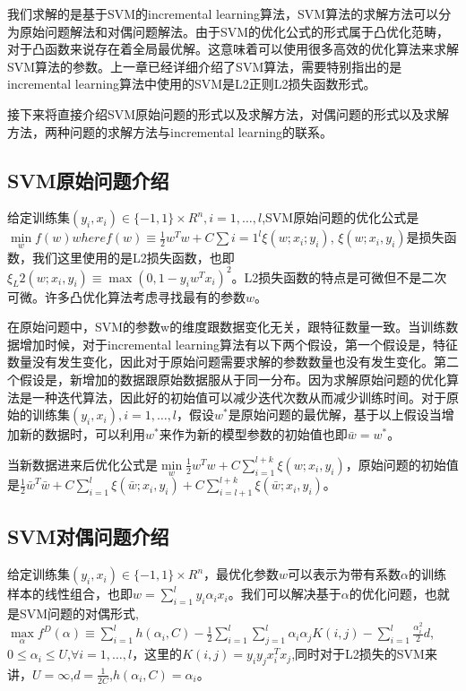 \documentclass[master]{njuthesis}
\begin{document}
\begin{enumerate}
\begin{enumerate}
\begin{enumerate}
    我们求解的是基于SVM的incremental learning算法，SVM算法的求解方法可以分为原始问题解法和对偶问题解法。由于SVM的优化公式的形式属于凸优化范畴，对于凸函数来说存在着全局最优解。这意味着可以使用很多高效的优化算法来求解SVM算法的参数。上一章已经详细介绍了SVM算法，需要特别指出的是incremental learning算法中使用的SVM是L2正则L2损失函数形式。

    接下来将直接介绍SVM原始问题的形式以及求解方法，对偶问题的形式以及求解方法，两种问题的求解方法与incremental learning的联系。

\subsection{SVM原始问题介绍}

    给定训练集$\left(y_i,x_i\right) \in \{-1, 1\} \times R^n, i = 1,\dots,l$,SVM原始问题的优化公式是$\min\limits_{w} f\left(w\right) where f\left(w\right)\equiv \frac{1}{2}w^Tw + C\sum{i=1}^l \xi\left(w;x_i;y_i\right)$, $\xi\left(w;x_i,y_i\right)$是损失函数，我们这里使用的是L2损失函数，也即$\xi_L2\left(w;x_i,y_i\right) \equiv \max\left(0,1-y_iw^Tx_i\right)^2$。L2损失函数的特点是可微但不是二次可微。许多凸优化算法考虑寻找最有的参数$w$。

   在原始问题中，SVM的参数w的维度跟数据变化无关，跟特征数量一致。当训练数据增加时候，对于incremental learning算法有以下两个假设，第一个假设是，特征数量没有发生变化，因此对于原始问题需要求解的参数数量也没有发生变化。第二个假设是，新增加的数据跟原始数据服从于同一分布。因为求解原始问题的优化算法是一种迭代算法，因此好的初始值可以减少迭代次数从而减少训练时间。对于原始的训练集$\left(y_i,x_i\right),i=1,\dots,l$，假设$w^*$是原始问题的最优解，基于以上假设当增加新的数据时，可以利用$w^*$来作为新的模型参数的初始值也即$\bar{w}=w^*$。

    当新数据进来后优化公式是$\min\limits_{w} \frac{1}{2}w^Tw+C\sum_{i=1}^{l+k} \xi\left(w;x_i,y_i\right)$，原始问题的初始值是$\frac{1}{2}\bar{w}^T\bar{w}+C\sum_{i=1}^l \xi\left(\bar{w};x_i,y_i\right)+C\sum_{i=l+1}^{l+k}\xi\left(\bar{w};x_i,y_i\right)$。

\subsection{SVM对偶问题介绍}
    
    给定训练集$\left(y_i,x_i\right) \in \{-1,1\} \times R^n$，最优化参数$w$可以表示为带有系数$\alpha$的训练样本的线性组合，也即$w=\sum_{i=1}^l y_i\alpha_ix_i$。我们可以解决基于$\alpha$的优化问题，也就是SVM问题的对偶形式,$\max\limits_{\alpha} f^D\left(\alpha\right) \equiv \sum_{i=1}^l h\left(\alpha_i,C\right)-\frac{1}{2}\sum_{i=1}^l \sum_{j=1}^l \alpha_i\alpha_j K\left(i,j\right)-\sum_{i=1}^l \frac{\alpha_i^2}{2}d$,$0 \le \alpha_i \le U$,$\forall i=1,\dots,l$，这里的$K\left(i,j\right)=y_iy_jx^T_ix_j$,同时对于L2损失的SVM来讲，$U=\infty$,$d=\frac{1}{2C}$,$h\left(\alpha_i,C\right)=\alpha_i$。
    

\end{enumerate}
\end{enumerate}
\end{enumerate}
\end{document}
